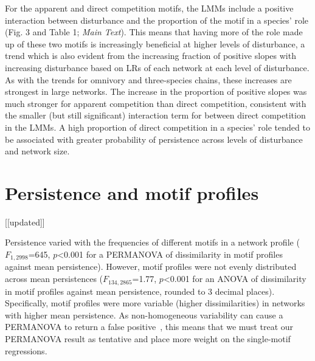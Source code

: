 \documentclass[12pt]{article}
\begin{document}
\begin{spacing}{2.0}
    For the apparent and direct competition motifs, the LMMs include a positive interaction between disturbance and the proportion of the motif in a species' role (Fig. 3 and Table 1; \emph{Main Text}).
    This means that having more of the role made up of these two motifs is increasingly beneficial at higher levels of disturbance, a trend which is also evident from the increasing fraction of positive slopes with increasing disturbance based on LRs of each network at each level of disturbance. %
    As with the trends for omnivory and three-species chains, these increases are strongest in large networks. %
    The increase in the proportion of positive slopes was much stronger for apparent competition than direct competition, consistent with the smaller (but still significant) interaction term for between direct competition in the LMMs.
    A high proportion of direct competition in a species' role tended to be associated with greater probability of persistence across levels of disturbance and network size.
\clearpage
                
\section{Persistence and motif profiles} [[updated]]

    Persistence varied with the frequencies of different motifs in a network profile ($F_{1,2998}$=645, $p$\textless0.001 for a PERMANOVA of dissimilarity in motif profiles against mean persistence).
    However, motif profiles were not evenly distributed across mean persistences ($F_{134,2865}$=1.77, $p$\textless0.001 for an ANOVA of dissimilarity in motif profiles against mean persistence, rounded to 3 decimal places).
    Specifically, motif profiles were more variable (higher dissimilarities) in networks with higher mean persistence.
    As non-homogeneous variability can cause a PERMANOVA to return a false positive~\citep{Anderson2001}, this means that we must treat our PERMANOVA result as tentative and place more weight on the single-motif regressions.



\end{spacing}
\end{document}
